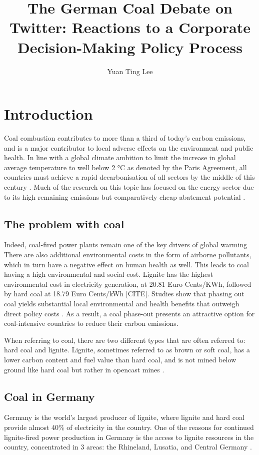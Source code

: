 \documentclass[12pt,onecolumn,twoside]{layout}
\title{The German Coal Debate on Twitter: Reactions to a Corporate Decision-Making Policy Process}
\author[a,b]{Yuan Ting Lee}
\affil[a]{Hertie School, Friedrichstr. 180, Berlin 10117, Germany}
\affil[b]{Mercator Research Institute on Global Commons and Climate Change, Torgauer Str. 12 - 15, Berlin 10829, Germany}
\begin{document}
\onehalfspacing
\maketitle
\thispagestyle{firststyle}

\section*{Introduction} \label{sec:introduction}
 Coal combustion contributes to more than a third of today's carbon emissions, and is a major contributor to local adverse effects on the environment and public health.  In line with a global climate ambition to limit the increase in global average temperature to well below 2 \si{\degree}C as denoted by the Paris Agreement, all countries must achieve a rapid decarbonisation of all sectors by the middle of this century \cite{Figueres2017}. Much of the research on this topic has focused on the energy sector due to its high remaining emissions but comparatively cheap abatement potential \cite{Armstrong2016}. 

\subsection*{The problem with coal}
Indeed, coal-fired power plants remain one of the key drivers of global warming \cite{Edwards2019,Zhao2019} There are also  additional environmental costs in the form of airborne pollutants, which in turn have a negative effect on human health as well. This leads to coal having a high environmental and social cost. Lignite has the highest environmental cost in electricity generation, at 20.81 Euro Cents/KWh, followed by hard coal at 18.79 Euro Cents/kWh [CITE]. Studies show that phasing out coal yields substantial local environmental and health benefits that outweigh direct policy costs \cite{Rauner2020}. As a result, a coal phase-out presents an attractive option for coal-intensive countries to reduce their carbon emissions.

When referring to coal, there are two different types that are often referred to: hard coal and lignite. Lignite, sometimes referred to as brown or soft coal, has a lower carbon content and fuel value than hard coal, and is not mined below ground like hard coal but rather in opencast mines \cite{Appunn2019}. 

\subsection*{Coal in Germany}
Germany is the world's largest producer of lignite, where lignite and hard coal provide almost 40\% of electricity in the country. One of the reasons for continued lignite-fired power production in Germany is the access to lignite resources in the country, concentrated in 3 areas: the Rhineland, Lusatia, and Central Germany \cite{AgoraEnergiewende2019}. 
\end{document}
